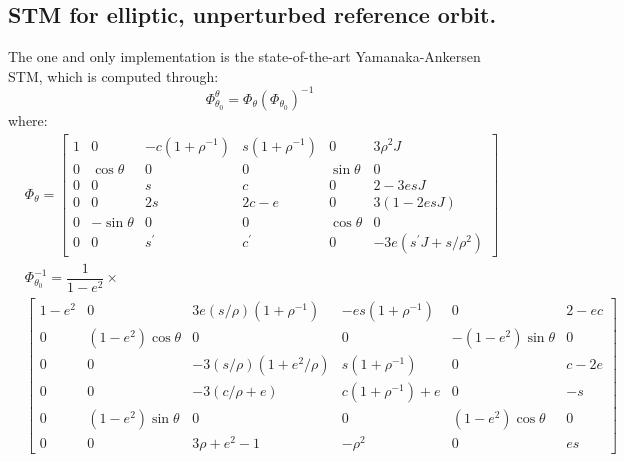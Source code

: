 	\subsection{STM for elliptic, unperturbed reference orbit.}
	\indent The one and only implementation is the state-of-the-art Yamanaka-Ankersen STM, which is computed through:
	\begin{equation}
	\Phi_{\theta_0}^{\theta} = \Phi_{\theta} \left(\Phi_{\theta_0}\right)^{-1}
	\end{equation}
	\noindent where:
	\begin{subequations}
	\begin{alignat}{2}
	&\label{eqCh3:phi_final} \Phi_{\theta} = 
	\left[
	\begin{array}{cccccc}
	1 	&    0 			&  -c  (1 + \rho^{-1})	& s  (1 + \rho^{-1})	&    0			&                  3 \rho^2 J \\
        0	&  \cos\theta 	&                   0	&                 0	&  \sin\theta 	&                              0\\
        0 	&  	0			&                  s	&                 c	&    0			&              2 - 3  e  s  J\\
        0	&    0			&              2  s		&         2  c - e	&    0			&       3  (1  - 2 e  s  J)\\
        0	& -\sin\theta   &                0 		&                 0&  \cos\theta 	&                              0\\
        0	&	0 			&             s^{\prime}	&            c^{\prime}&    0			& -3  e  (s^{\prime}  J + s/\rho^2)
	\end{array}
	\right] \\
	&\nonumber \Phi_{\theta_0}^{-1} = \dfrac{1}{1 - e^2}\times \\ 
	&\label{eqCh3:phi_inv_final}\left[
	\begin{array}{cccccc}
	1 - e^2	&    0 					&  3 e  (s/\rho)  (1 + \rho^{-1})		& -e s  (1 + \rho^{-1})	&    0						&                 2 - e c\\
        0		&  (1 - e^2) \cos\theta	&         0							&                 0		&  -(1 - e^2) \sin\theta 	&              0\\
        0 		&  	0					&     -3  (s/\rho)  (1 + e^2/\rho)	&   s  (1 + \rho^{-1})	&    0						&              c - 2e	\\
        0		&    0					&          -3  (c/\rho + e)			&  c  (1 + \rho^{-1}) + e	&    0						&      -s 		\\
        0		& (1 - e^2) \sin\theta 	&                0 					&                 0		&  (1 - e^2) \cos\theta 	&                              0\\
        0		&	0 					&             3  \rho + e^2 - 1		&           -\rho^2 	&    0						& e s
	\end{array}
	\right]
	\end{alignat}
	\end{subequations}

